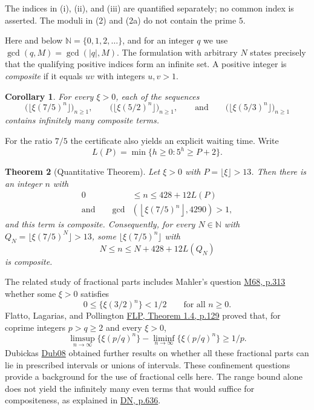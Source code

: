 \documentclass[11pt,reqno]{amsart}
\newtheorem{theorem}{Theorem}
\newtheorem{corollary}[theorem]{Corollary}
\theoremstyle{definition}
\theoremstyle{remark}
\begin{document}
The indices in (i), (ii), and (iii) are quantified separately; no common
index is asserted. The moduli in (2) and (2a) do not contain the prime
\(5\).

Here and below \(\mathbb N=\{0,1,2,\ldots\}\), and for an integer \(q\)
we use \(\gcd(q,M)=\gcd(|q|,M)\). The formulation with arbitrary \(N\)
states precisely that the qualifying positive indices form an infinite set.
A positive integer is \emph{composite} if it equals \(uv\) with integers
\(u,v>1\).

\begin{samepage}
\begin{corollary}\leavevmode\label{thm:2}
For every \(\xi>0\), each of the sequences
\[
\bigl(\lfloor\xi(7/5)^n\rfloor\bigr)_{n\ge1},\qquad \bigl(\lfloor\xi(5/2)^n\rfloor\bigr)_{n\ge1},\qquad \text{and}\qquad \bigl(\lfloor\xi(5/3)^n\rfloor\bigr)_{n\ge1}
\]
contains infinitely
many composite terms.
\label{thm-end:2}
\end{corollary}
\end{samepage}

For the ratio \(7/5\) the certificate also yields an explicit waiting
time. Write
\[
L(P)=\min\{h\ge0:5^h\ge P+2\}.
\]

\begin{samepage}
\begin{theorem}[Quantitative Theorem]\leavevmode\label{thm:3}
Let \(\xi>0\) with
\(P=\lfloor\xi\rfloor>13\). Then there is an integer \(n\) with
\[
\begin{aligned}
0&\le n\le428+12L(P)\\
\text{and}\qquad
\gcd\!&\left(\left\lfloor\xi(7/5)^n\right\rfloor,4290\right)>1,
\end{aligned}
\tag{3}\label{eq:3}
\]
and this term is composite. Consequently, for every \(N\in\mathbb N\)
with \(Q_N=\lfloor\xi(7/5)^N\rfloor>13\), some
\(\lfloor\xi(7/5)^n\rfloor\) with
\[
N\le n\le N+428+12L(Q_N)
\]
is
composite.
\label{thm-end:3}
\end{theorem}
\end{samepage}

The related study of fractional parts includes Mahler's question
\hyperref[ref-m68]{M68, p.313} whether some \(\xi>0\) satisfies
\[
0\le\{\xi(3/2)^n\}<1/2\qquad\text{for all }n\ge0.
\]
Flatto, Lagarias, and Pollington
\hyperref[ref-flp]{FLP, Theorem 1.4, p.129} proved that, for coprime integers
\(p>q\ge2\) and every \(\xi>0\),
\[
\limsup_{n\to\infty}\{\xi(p/q)^n\}
-\liminf_{n\to\infty}\{\xi(p/q)^n\}\ge1/p.
\]
Dubickas \hyperref[ref-dub08]{Dub08} obtained further results on whether all
these fractional parts can lie in prescribed intervals or unions of
intervals. These confinement questions provide a background for the use
of fractional cells here. The range bound alone does not yield the
infinitely many even terms that would suffice for compositeness, as
explained in \hyperref[ref-dn]{DN, p.636}.
\end{document}
